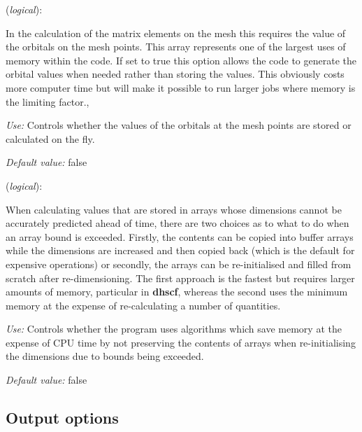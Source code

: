 \documentclass[11pt]{article}
\begin{document}
\begin{description}
\itemsep 10pt
\parsep 0pt

\item[{\bf DirectPhi}] ({\it logical}):

In the calculation of the matrix elements on the mesh this requires the
value of the orbitals on the mesh points. This array represents one of
the largest uses of memory within the code. If set to true this option
allows the code to generate the orbital values when needed rather than
storing the values. This obviously costs more computer time but will
make it possible to run larger jobs where memory is the limiting factor.,

{\it Use:} Controls whether the values of the orbitals at the mesh points
  are stored or calculated on the fly.

{\it Default value:}  false

\item[{\bf SaveMemory}] ({\it logical}):

When calculating values that are stored in arrays whose dimensions
cannot be accurately predicted ahead of time, there are two choices
as to what to do when an array bound is exceeded. Firstly, the
contents can be copied into buffer arrays while the dimensions
are increased and then copied back (which is the default for
expensive operations) or secondly, the arrays can be re-initialised
and filled from scratch after re-dimensioning. The first approach
is the fastest but requires larger amounts of memory, particular
in {\bf dhscf}, whereas the second uses the minimum memory at the
expense of re-calculating a number of quantities.

{\it Use:} Controls whether the program uses algorithms which save memory
  at the expense of CPU time by not preserving the contents of arrays
  when re-initialising the dimensions due to bounds being exceeded. 

{\it Default value:}  false

\end{description}


\vspace{5pt}
\subsection{Output options}
\end{document}
